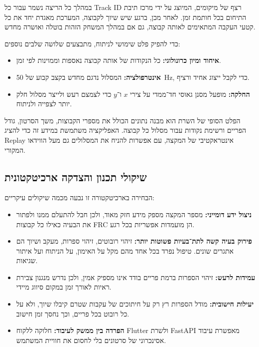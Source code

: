 במהלך כל הריצה נשמר עבור כל \textenglish{Track ID} רצף של מיקומים,
המיוצג על ידי מרכז תיבת התיחום בכל חותמת זמן. לאחר מכן, ברגע שיש שיוך
לקבוצה, המערכת מאגדת יחד את כל קטעי העקבה המתאימים לאותה קבוצה, גם אם
במהלך המשחק הזהות בוטלה ואושרה מחדש.

כדי להפיק פלט שימושי לניתוח, מתבצעים שלושה שלבים נוספים:

\begin{itemize}
\item \textbf{איחוד ומיון כרונולוגי:} כל הנקודות של אותה קבוצה נאספות
  וממוינות לפי זמן.
\item \textbf{אינטרפולציה:} המסלול נדגם מחדש בקצב קבוע של
  \textenglish{\qty{50}{\Hz}}, כדי לקבל ייצוג אחיד ורציף.
\item \textbf{החלקה:} מופעל מסנן גאוסי חד־ממדי על צירי $x$ ו־$y$ כדי
  לצמצם רעש ולייצר מסלול חלק יותר לצפייה ולניתוח.
\end{itemize}

הפלט הסופי של השרת הוא מבנה נתונים הכולל את מספרי הקבוצות, משך הסרטון,
גודל הפריים ורשימת נקודות עבור מסלול כל קבוצה. האפליקציה משתמשת במידע
זה כדי להציג \textenglish{Replay} אינטראקטיבי של המקצה, עם אפשרות
להניח את המסלולים גם מעל הווידאו המקורי.

\subsection{שיקולי תכנון והצדקה ארכיטקטונית}

הבחירה בארכיטקטורה זו נבעה מכמה שיקולים עיקריים:

\begin{itemize}
\item \textbf{ניצול ידע דומייני:} מספר המקצה מספק מידע חזק מאוד, ולכן
  חבל להתעלם ממנו ולפתור את הבעיה כאילו כל קבוצות \textenglish{FRC}
  הן מועמדות אפשריות בכל רגע.
\item \textbf{פירוק בעיה קשה לתת־בעיות פשוטות יותר:} זיהוי רובוטים,
  זיהוי ספרות, מעקב ושיוך הם אתגרים שונים. טיפול נפרד בכל אחד מהם מקל על
  האימון, על הניתוח ועל איתור שגיאות.
\item \textbf{עמידות לרעש:} זיהוי הספרות ברמת פריים בודד אינו מספיק
  אמין, ולכן נדרש מנגנון צבירת ראיות לאורך זמן במקום סיווג מיידי.
\item \textbf{יעילות חישובית:} מודל הספרות רץ רק על חיתוכים של עקבות
  שטרם קיבלו שיוך, ולא על כל רובוט בכל פריים, וכך נחסך זמן חישוב.
\item \textbf{הפרדה בין ממשק לעיבוד:} חלוקה ללקוח \textenglish{Flutter}
  ולשרת \textenglish{FastAPI} מאפשרת עיבוד אסינכרוני של סרטונים בלי
  לחסום את חוויית המשתמש.
\end{itemize}

